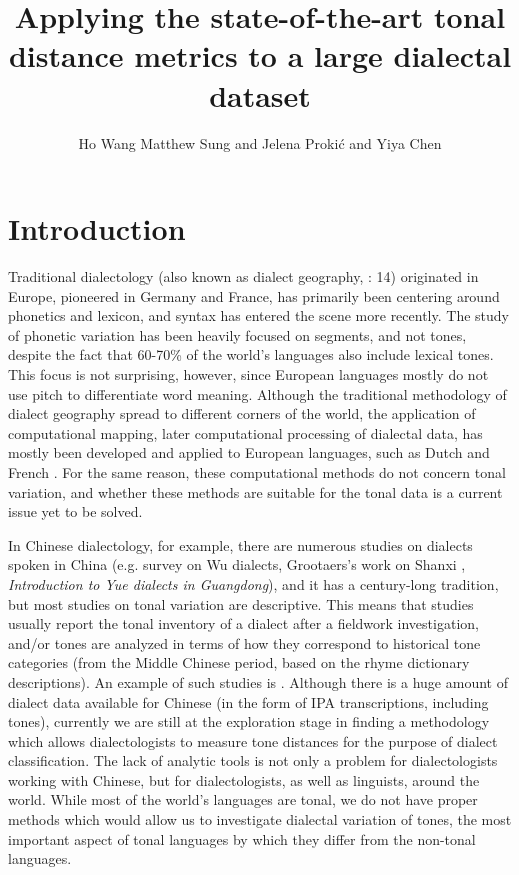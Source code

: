\documentclass[output=paper, chinesefont]{langscibook}
\author{Ho Wang Matthew Sung\orcid{}\affiliation{Leiden University} and Jelena Prokić\orcid{}\affiliation{Leiden University} and Yiya Chen\orcid{}\affiliation{Leiden University}}
\title[Applying tonal distance metrics to a large dialectal dataset]{Applying the state-of-the-art tonal distance metrics to a large dialectal dataset}
\begin{document}
\graphicspath{{figures/sung}}
\maketitle 
\label{chap:sung}

\section{Introduction}
\label{sec:sung:1}

Traditional dialectology (also known as dialect geography, \citealt{ChambersTrudgill1998}: 14) originated in Europe, pioneered in Germany and France, has primarily been centering around phonetics and lexicon, and syntax has entered the scene more recently. The study of phonetic variation has been heavily focused on segments, and not tones, despite the fact that 60-70\% of the world’s languages also include lexical tones. This focus is not surprising, however, since European languages mostly do not use pitch to differentiate word meaning. Although the traditional methodology of dialect geography spread to different corners of the world, the application of computational mapping, later computational processing of dialectal data, has mostly been developed and applied to European languages, such as Dutch \citep{Heeringa2004} and French \citep{Goebl1984}. For the same reason, these computational methods do not concern tonal variation, and whether these methods are suitable for the tonal data is a current issue yet to be solved.

In Chinese dialectology, for example, there are numerous studies on dialects spoken in China (e.g.  survey on Wu dialects, Grootaers’s work on Shanxi \citep{Grootaers2003},  \textit{Introduction to Yue dialects in Guangdong}), and it has a century-long tradition, but most studies on tonal variation are descriptive. This means that studies usually report the tonal inventory of a dialect after a fieldwork investigation, and/or tones are analyzed in terms of how they correspond to historical tone categories (from the Middle Chinese period, based on the rhyme dictionary descriptions). An example of such studies is \citet{Zhan2002}. Although there is a huge amount of dialect data available for Chinese (in the form of IPA transcriptions, including tones), currently we are still at the exploration stage in finding a methodology which allows dialectologists to measure tone distances for the purpose of dialect classification.  The lack of analytic tools is not only a problem for dialectologists working with Chinese, but for dialectologists, as well as linguists, around the world. While most of the world’s languages are tonal, we do not have proper methods which would allow us to investigate dialectal variation of tones, the most important aspect of tonal languages by which they differ from the non-tonal languages.
\end{document}
